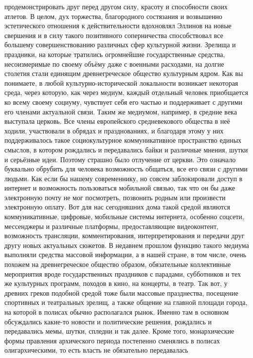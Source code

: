 продемонстрировать друг перед другом силу, красоту и способности своих атлетов.
В целом, дух торжества, благородного состязания и возвышенно эстетического
отношения к действительности вдохновлял Эллинов на новые свершения и в силу
такого позитивного соперничества способствовал все большему совершенствованию
различных сфер культурной жизни. Зрелища и праздники, на которые тратились
огромнейшие государственные средства, несоизмеримые по своему объёму даже с
военными расходами, на долгие столетия стали единящим древнегреческое общество
культурным ядром. Как вы понимаете, в любой культурно-исторической локальности
возникает некоторая среда, через которую, как через медиум, каждый отдельный
человек приобщается ко всему своему социуму, чувствует себя его частью и
поддерживает с другими его членами актуальной связи. Таким же медиумом,
например, в средние века выступала церковь. Все члены европейского
средневекового общества в неё ходили, участвовали в обрядах и празднованиях, и
благодаря этому у них поддерживалось такое социокультурное коммуникативное
пространство единых смыслов, в котором рождались и передавались байки и
различные мнения, шутки и серьёзные идеи. Поэтому страшно было отлучение от
церкви. Это означало буквально обрубить для человека возможность общаться, все
его связи с другими людьми. Как если бы нашему современнику, но совсем
заблокировали доступ в интернет и возможность пользоваться мобильной связью, так
что он бы даже электронную почту не мог посмотреть, позвонить родным или
произвести электронную оплату. Вот для нас сегодняшних дома такой средой
являются коммуникативные, цифровые, мобильные системы интернета, особенно
соцсети, мессенджеры и различные платформы, предоставляющие видеоконтент,
возможность трансляции, комментирования, интерпретирования и передачи друг другу
новых актуальных сюжетов. В недавнем прошлом функцию такого медиума выполняли
средства массовой информации, а в нашей стране, в том числе, очень похожем на
древнегреческое общество образом, обязательные коллективные мероприятия вроде
государственных праздников с парадами, субботников и тех же культурных программ,
походов в кино, на концерты, в театр. Так вот, у древних греков подобной средой
тоже были массовые празднества, посещение спортивных и театральных зрелищ, а
также общение на главной площади города, на которой в полисах обычно
располагался рынок. Именно там в основном обсуждались какие-то новости и
политические решения, рождались и передавались мемы, шутки, спледни и так далее.
Кроме того, монархические формы правления архического периода постепенно
сменялись в полисах олигархическими, то есть власть не обязательно передавалась
